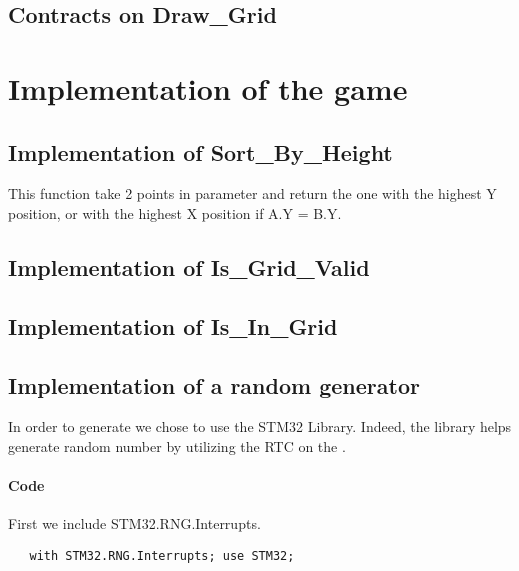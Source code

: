 \subsection{Contracts on Draw\_Grid}


\newpage

\section{Implementation of the game}

\subsection{Implementation of Sort\_By\_Height}

\noindent
This function take 2 points in parameter and return the one with the highest Y
position, or with the highest X position if A.Y = B.Y.


\subsection{Implementation of Is\_Grid\_Valid}


\subsection{Implementation of Is\_In\_Grid}


\newpage

\subsection{Implementation of a random \sq generator}

In order to generate \sqs we chose to use the STM32 Library.
Indeed, the library helps generate random number by utilizing the RTC on the \stmdb.

\paragraph{Code}

\noindent
First we include STM32.RNG.Interrupts.
\begin{lstlisting}
   with STM32.RNG.Interrupts; use STM32;
\end{lstlisting}


